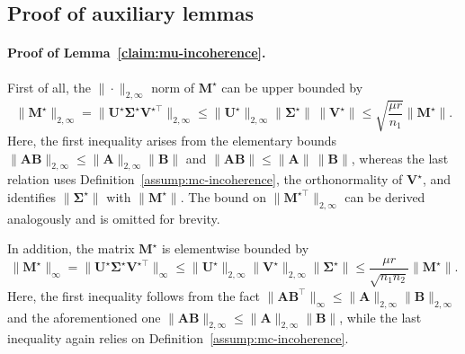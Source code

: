  


\subsection{Proof of auxiliary lemmas}
\label{sec:proof-auxiliary-lemmas-MC-L2}

\paragraph{Proof of Lemma~\ref{claim:mu-incoherence}.}
First of all, the  $\|\cdot\|_{2,\infty}$ norm of $\bm{M}^{\star}$
can be upper bounded by
%
\begin{equation*}
\|\bm{M}^{\star}\|_{2,\infty}=\|\bm{U}^{\star}\bm{\Sigma}^{\star}\bm{V}^{\star\top}\|_{2,\infty}\leq\|\bm{U}^{\star}\|_{2,\infty}\|\bm{\Sigma}^{\star}\| \, \|\bm{V}^{\star}\|\leq\sqrt{\frac{\mu r}{n_{1}}} \big\| \bm{M}^{\star} \big\|.
\end{equation*}
%
Here, the first inequality arises from the elementary bounds
$\|\bm{A}\bm{B}\|_{2,\infty}\leq\|\bm{A}\|_{2,\infty}\|\bm{B}\|$
and $\|\bm{A}\bm{B}\|\leq\|\bm{A}\|\, \|\bm{B}\|$, whereas the last relation
uses Definition~\ref{assump:mc-incoherence}, the orthonormality
of $\bm{V}^{\star}$, and identifies $\|\bm{\Sigma}^{\star}\|$ with
$\| \bm{M}^{\star} \|$. The  bound on $\|\bm{M}^{\star\top}\|_{2,\infty}$ can be derived analogously and is omitted for brevity.



In addition, the matrix $\bm{M}^{\star}$ is elementwise bounded by
%
\begin{equation*}
\|\bm{M}^{\star}\|_{\infty}=\|\bm{U}^{\star}\bm{\Sigma}^{\star}\bm{V}^{\star\top}\|_{\infty}\leq\|\bm{U}^{\star}\|_{2,\infty}\|\bm{V}^{\star}\|_{2,\infty} \|\bm{\Sigma}^{\star}\|
	\leq\frac{\mu r}{\sqrt{n_{1}n_{2}}} \big\| \bm{M}^{\star} \big\|.
\end{equation*}
%
Here, the first inequality follows from the fact $\|\bm{A}\bm{B}^{\top}\|_{\infty}\leq\|\bm{A}\|_{2,\infty}\|\bm{B}\|_{2,\infty}$
and the aforementioned one $\|\bm{A}\bm{B}\|_{2,\infty}\leq\|\bm{A}\|_{2,\infty}\|\bm{B}\|$,
while the last inequality again relies on Definition~\ref{assump:mc-incoherence}.


